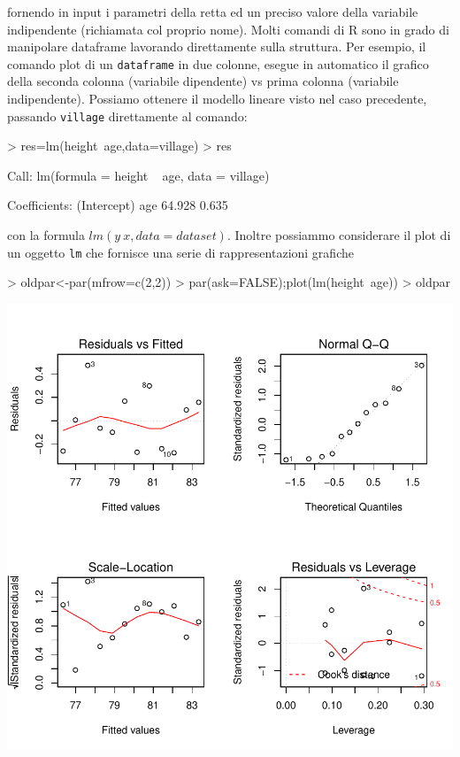 \documentclass[onecolumn,12pt]{book}
\begin{document}
fornendo in input i parametri della retta ed un preciso valore della variabile indipendente (richiamata col proprio nome).
Molti comandi di \textsf{R} sono in grado di manipolare dataframe  lavorando direttamente sulla struttura. Per esempio, il comando plot di un \texttt{dataframe} in due colonne, esegue in automatico il grafico della seconda colonna (variabile dipendente) vs prima colonna (variabile indipendente).
Possiamo ottenere il modello lineare visto nel caso precedente, passando \texttt{village} direttamente al comando:
\begin{Schunk}
\begin{Sinput}
> res=lm(height~age,data=village)
> res
\end{Sinput}
\begin{Soutput}
Call:
lm(formula = height ~ age, data = village)

Coefficients:
(Intercept)          age  
     64.928        0.635  
\end{Soutput}
\end{Schunk}
con la formula $lm(y ~x,data=dataset)$.
Inoltre possiammo considerare il plot di un oggetto \texttt{lm}  che fornisce una serie di rappresentazioni grafiche
\begin{Schunk}
\begin{Sinput}
> oldpar<-par(mfrow=c(2,2))
> par(ask=FALSE);plot(lm(height~age))
> oldpar
\end{Sinput}
\end{Schunk}
\includegraphics{RbookParte2-057}
\end{document}
